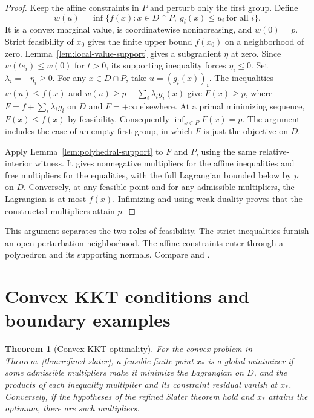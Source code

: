 \documentclass[11pt,oneside,openany]{book}
\theoremstyle{plain}
\newtheorem{theorem}{Theorem}[chapter]
\theoremstyle{definition}
\theoremstyle{remark}
\begin{document}
\begin{proof}
Keep the affine constraints in \(P\) and perturb only the
first group. Define
\[
 w(u)=\inf\{f(x): x\in D\cap P,\ g_i(x)\le u_i\ \text{for all }i\}.
\]
It is a convex marginal value, is coordinatewise
nonincreasing, and \(w(0)=p\). Strict feasibility of
\(x_0\) gives the finite upper bound \(f(x_0)\) on
a neighborhood of zero. Lemma~\ref{lem:local-value-support}
gives a subgradient \(\eta\) at zero. Since
\(w(t e_i)\le w(0)\) for \(t>0\), its supporting
inequality forces \(\eta_i\le0\). Set
\(\lambda_i=-\eta_i\ge0\).
For any \(x\in D\cap P\), take \(u=(g_i(x))_i\).
The inequalities \(w(u)\le f(x)\) and
\(w(u)\ge p-\sum_i\lambda_i g_i(x)\) give
\(F(x)\ge p\), where \(F=f+\sum_i\lambda_i g_i\)
on \(D\) and \(F=+\infty\) elsewhere.
At a primal minimizing sequence,
\(F(x)\le f(x)\) by feasibility.
Consequently \(\inf_{x\in P}F(x)=p\).
The argument includes the case of an empty first group,
in which \(F\) is just the objective on \(D\).

Apply Lemma~\ref{lem:polyhedral-support} to \(F\) and \(P\),
using the same relative-interior witness.
It gives nonnegative multipliers for the affine
inequalities and free multipliers for the equalities,
with the full Lagrangian bounded below by \(p\) on \(D\).
Conversely, at any feasible point and for any admissible
multipliers, the Lagrangian is at most \(f(x)\).
Infimizing and using weak duality proves that the
constructed multipliers attain \(p\).
\end{proof}

This argument separates the two roles of feasibility.
The strict inequalities furnish an open perturbation
neighborhood. The affine constraints enter through
a polyhedron and its supporting normals.
Compare \cite[Sections 5.2.3 and 5.3.2]{Boyd}
and \cite[Sections 20 and 28]{Rockafellar}.

\section{Convex KKT conditions and boundary examples}
\label{v04-07}

\begin{theorem}[Convex KKT optimality]\label{thm:convex-kkt}
For the convex problem in Theorem~\ref{thm:refined-slater},
a feasible finite point \(x_*\) is a global minimizer
if some admissible multipliers make it minimize
the Lagrangian on \(D\), and the products of each
inequality multiplier and its constraint residual vanish
at \(x_*\).
Conversely, if the hypotheses of the refined Slater
theorem hold and \(x_*\) attains the optimum, there
are such multipliers.
\end{theorem}
\end{document}
